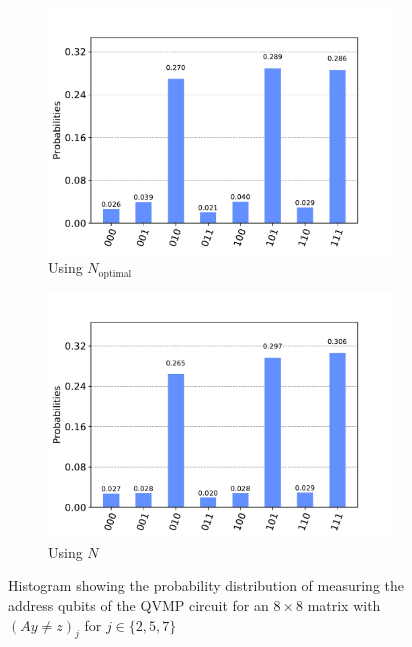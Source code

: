 \documentclass[11pt]{article}
\theoremstyle{definition}
\theoremstyle{remark}
\begin{document}
\begin{figure}[h!]
  \centering
  \begin{subfigure}{0.48\textwidth}
    \centering
    \includegraphics[width=\textwidth]{../results/figures/qvmp_functionality_found_known.pdf}
    \caption{Using $N_{\text{optimal}}$}
  \end{subfigure}
  \begin{subfigure}{0.48\textwidth}
    \centering
    \includegraphics[width=\textwidth]{../results/figures/qvmp_functionality_found_unknown.pdf}
    \caption{Using $N$}
  \end{subfigure}
  \caption{Histogram showing the probability distribution of measuring the
  address qubits of the QVMP circuit for an $8 \times 8$ matrix with $(Ay \neq
  z)_j$ for $j \in \{2, 5, 7\}$}
  \label{fig:qvmp_functionality_found}
\end{figure}
\end{document}
